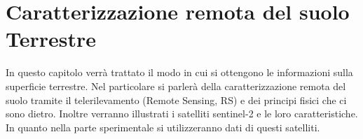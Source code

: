 \chapter{Caratterizzazione remota del suolo Terrestre}
In questo capitolo verrà trattato il modo in cui si ottengono le informazioni 
sulla superficie terrestre. Nel particolare si parlerà della caratterizzazione remota 
del suolo tramite il telerilevamento (Remote Sensing, RS) e dei principi 
fisici che ci sono dietro.
Inoltre verranno illustrati i satelliti sentinel-2 e le loro caratteristiche. 
In quanto nella parte sperimentale si utilizzeranno dati di questi satelliti.
